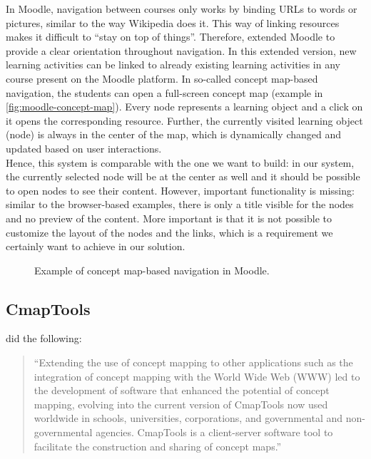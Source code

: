 In Moodle, navigation between courses only works by binding URLs to words or pictures, similar to the way Wikipedia does it. This way of linking resources makes it difficult to  ``stay on top of things''. Therefore, \cite{scherl2012moodle} extended Moodle to provide a clear orientation throughout navigation. In this extended version, new learning activities can be linked to already existing learning activities in any course present on the Moodle platform. In so-called concept map-based navigation, the students can open a full-screen concept map (example in \autoref{fig:moodle-concept-map}). Every node represents a learning object and a click on it opens the corresponding resource. Further, the currently visited learning object (node) is always in the center of the map, which is dynamically changed and updated based on user interactions.\\

Hence, this system is comparable with the one we want to build: in our system, the currently selected node will be at the center as well and it should be possible to open nodes to see their content. However, important functionality is missing: similar to the browser-based examples, there is only a title visible for the nodes and no preview of the content. More important is that it is not possible to customize the layout of the nodes and the links, which is a requirement we certainly want to achieve in our solution.

\begin{figure}[H]
	\centering
	\caption{Example of concept map-based navigation in Moodle.}
	\label{fig:moodle-concept-map}
\end{figure}


\subsection{CmapTools}
\cite{novak2006conceptmapping} did the following:
\begin{quote}
	``Extending the use of concept mapping to other applications such as the integration of concept mapping with the World Wide Web (WWW) led to the development of software that enhanced the potential of concept mapping, evolving into the current version of CmapTools now used worldwide in schools, universities, corporations, and governmental and non-governmental agencies. CmapTools is a client-server software tool to facilitate the construction and sharing of concept maps.''
\end{quote}

